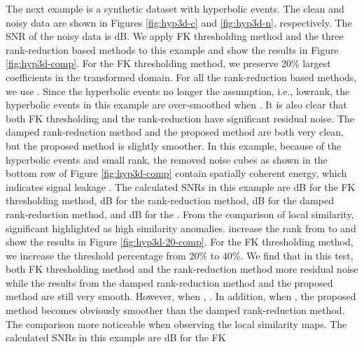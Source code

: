 The next example is a synthetic dataset with hyperbolic events.  The clean and noisy data are shown in Figures \ref{fig:hyp3d-c} and \ref{fig:hyp3d-n}, respectively. The SNR of the noisy data is  dB. We apply FK thresholding method and the three rank-reduction based methods to this example and show the results in Figure \ref{fig:hyp3d-comp}. For the FK thresholding method, we preserve 20\% largest coefficients in the transformed domain. For all the rank-reduction based methods, we use . Since the hyperbolic events no longer  the assumption, i.e.,  lowrank, the hyperbolic events in this example are over-smoothed when . It is also clear that both FK thresholding and the rank-reduction  have significant residual noise. The damped rank-reduction method and the proposed method are both very clean, but the proposed method is slightly smoother. In this example, because of the hyperbolic events and  small rank, the removed noise cubes as shown in the bottom row of Figure \ref{fig:hyp3d-comp} contain  spatially coherent energy, which indicates signal leakage \cite[]{yangkang2015ortho}.  The calculated SNRs in this example are  dB for the FK thresholding method,  dB for the rank-reduction method,  dB for the damped rank-reduction method, and  dB for the .  From the comparison of local similarity, significant  highlighted as high similarity anomalies.  increase the rank from  to  and show the results in Figure \ref{fig:hyp3d-20-comp}. For the FK thresholding method, we increase the threshold percentage from 20\% to 40\%. We find that in this test, both FK thresholding method and the rank-reduction method  more residual noise while the results from the damped rank-reduction method and the proposed method are still very smooth.  However, when ,  . In addition, when , the proposed method becomes obviously smoother than the damped rank-reduction method. The comparison  more noticeable when observing the local similarity maps. The calculated SNRs in this example are  dB for the FK 